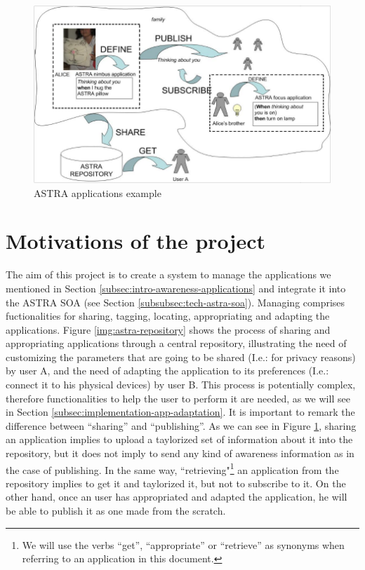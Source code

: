 \begin{figure}[h!]
 \begin{center}
 \includegraphics[scale=0.4]{screenshots/astra-applications-schema.png}
  \caption{\label{img:astra-applications-schema}ASTRA applications example}
 \end{center}
\end{figure}

\section{Motivations of the project}

The aim of this project is to create a system to manage the applications we
mentioned in Section \ref{subsec:intro-awareness-applications} and integrate
it into the ASTRA SOA (see Section \ref{subsubsec:tech-astra-soa}).
Managing comprises fuctionalities for sharing, tagging, locating,
appropriating and adapting the applications.
Figure \ref{img:astra-repository} shows the process of sharing and
appropriating applications through a central repository, illustrating the need
of customizing the parameters that are going to be shared (I.e.: for privacy
reasons) by user A, and the need of adapting the application to its
preferences (I.e.: connect it to his physical devices) by user B.
This process is potentially complex, therefore functionalities to help the user
to perform it are needed, as we will see in Section
\ref{subsec:implementation-app-adaptation}.
It is important to remark the difference between ``sharing'' and
``publishing''.  As we can see in Figure
\ref{img:astra-applications-schema}, sharing an application implies to upload a
taylorized set of information about it into the repository, but it does not
imply to send any kind of awareness information as in the case of publishing.
In the same way, ``retrieving"\footnote{We will use the verbs ``get'',
``appropriate'' or ``retrieve'' as synonyms when referring to an application in
this document.} an application from the repository implies to get it and taylorized
it, but not to subscribe to it.
On the other hand, once an user has appropriated and adapted the application, he
will be able to publish it as one made from the scratch.

